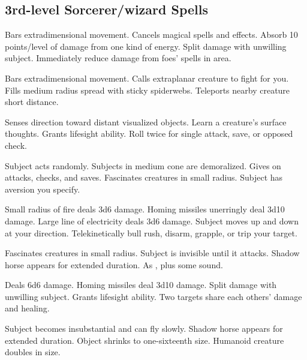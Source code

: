 \subsection{3rd-level Sorcerer/wizard Spells} 
\begin{swspelllist}
   Bars extradimensional movement.
   Cancels magical spells and effects.
   Absorb 10 points/level of damage from one kind of energy.
   Split damage with unwilling subject.
   Immediately reduce damage from foes' spells in area.

   Bars extradimensional movement.
   Calls extraplanar creature to fight for you.
   Fills medium radius spread with sticky spiderwebs.
   Teleports nearby creature short distance.

   Senses direction toward distant visualized objects.
   Learn a creature's surface thoughts.
   Grants lifesight ability.
   Roll twice for single attack, save, or opposed check.

   Subject acts randomly.
   Subjects in medium cone are demoralized.
   Gives  on attacks, checks, and saves.
   Fascinates creatures in small radius.
   Subject has aversion you specify.

   Small radius of fire deals 3d6 damage.
   Homing missiles unerringly deal 3d10 damage.
   Large line of electricity deals 3d6 damage.
   Subject moves up and down at your direction.
   Telekinetically bull rush, disarm, grapple, or trip your target.

   Fascinates creatures in small radius.
   Subject is invisible until it attacks.
   Shadow horse appears for extended duration.
   As , plus some sound.

   Deals 6d6 damage.
   Homing missiles deal 3d10 damage.
   Split damage with unwilling subject.
   Grants lifesight ability.
   Two targets share each others' damage and healing.

   Subject becomes insubstantial and can fly slowly.
   Shadow horse appears for extended duration.
   Object shrinks to one-sixteenth size.
   Humanoid creature doubles in size.
\end{swspelllist}

